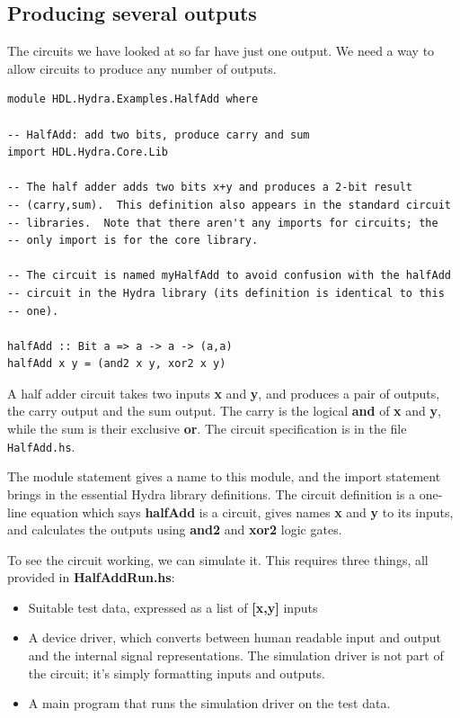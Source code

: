 \documentclass[]{svmono}
\begin{document}
\subsection*{Producing several outputs}
\label{sec:orgb0b63ff}

The circuits we have looked at so far have just one output.  We need a
way to allow circuits to produce any number of outputs.

\begin{verbatim}
module HDL.Hydra.Examples.HalfAdd where

-- HalfAdd: add two bits, produce carry and sum
import HDL.Hydra.Core.Lib

-- The half adder adds two bits x+y and produces a 2-bit result
-- (carry,sum).  This definition also appears in the standard circuit
-- libraries.  Note that there aren't any imports for circuits; the
-- only import is for the core library.

-- The circuit is named myHalfAdd to avoid confusion with the halfAdd
-- circuit in the Hydra library (its definition is identical to this
-- one).

halfAdd :: Bit a => a -> a -> (a,a)
halfAdd x y = (and2 x y, xor2 x y)
\end{verbatim}

A half adder circuit takes two inputs \textbf{x} and \textbf{y}, and produces a pair
of outputs, the carry output and the sum output.  The carry is the
logical \textbf{and} of \textbf{x} and \textbf{y}, while the sum is their exclusive \textbf{or}.
The circuit specification is in the file \texttt{HalfAdd.hs}.

The module statement gives a name to this module, and the import
statement brings in the essential Hydra library definitions.  The
circuit definition is a one-line equation which says \textbf{halfAdd} is a
circuit, gives names \textbf{x} and \textbf{y} to its inputs, and calculates the
outputs using \textbf{and2} and \textbf{xor2} logic gates.

To see the circuit working, we can simulate it.  This requires
three things, all provided in \textbf{HalfAddRun.hs}:

\begin{itemize}
\item Suitable test data, expressed as a list of \textbf{{[}x,y]} inputs
\item A device driver, which converts between human readable input and
output and the internal signal representations.  The simulation
driver is not part of the circuit; it's simply formatting inputs
and outputs.
\item A main program that runs the simulation driver on the test data.
\end{itemize}
\end{document}
